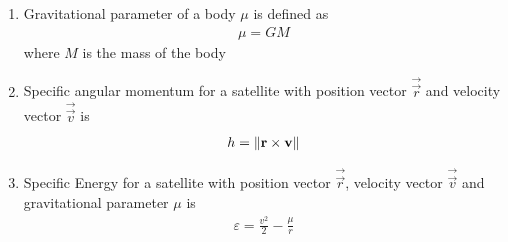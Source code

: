 \begin{enumerate}[label=\thesubsection.\arabic*, ref=\thesubsection.\theenumi]
\begin{align}
r^2 \brak{\vec{r}\brak{\theta}^{\top}\vec{V}\vec{r}\brak{\theta}} + 2r \brak{\vec{u}^{\top}\vec{r}\brak{\theta}} + f = 0
\label{eq:EE26BTECH11202-polar_quad}
\end{align}
Evaluating the inner products:
\begin{align}
\vec{n}^{\top}\vec{r}\brak{\theta} &= \myvec{\cos\theta_0 & \sin\theta_0}\myvec{\cos\theta \\ \sin\theta} = \cos\brak{\theta - \theta_0}
\\
\vec{r}\brak{\theta}^{\top}\vec{V}\vec{r}\brak{\theta} &= \vec{r}\brak{\theta}^{\top}\brak{\vec{I} - e^2\vec{n}\vec{n}^{\top}}\vec{r}\brak{\theta} = 1 - e^2 \cos^2\brak{\theta - \theta_0}
\\
\vec{u}^{\top}\vec{r}\brak{\theta} &= -p e^2 \cos\brak{\theta - \theta_0}
\end{align}
Substituting these into \eqref{eq:EE26BTECH11202-polar_quad}:
\begin{align}
r^2 \sbrak{1 - e^2 \cos^2\brak{\theta - \theta_0}} - 2r p e^2 \cos\brak{\theta - \theta_0} - p^2 e^2 = 0
\end{align}
Factoring the quadratic expression:
\begin{align}
\sbrak{r\brak{1 + e\cos\brak{\theta - \theta_0}} - ep} \sbrak{r\brak{1 - e\cos\brak{\theta - \theta_0}} + ep} = 0
\end{align}
Taking the positive real root for radial distance $r > 0$:
\begin{align}
r\brak{1 + e\cos\brak{\theta - \theta_0}} = ep
\end{align}
yielding \eqref{eq:EE26BTECH11202-polar_conic}
\item Gravitational parameter of a body $\mu$ is defined as
\begin{align}
	\mu=GM
\end{align}
where $M$ is the mass of the body
\item Specific angular momentum for a satellite with position vector $\vec{\vec{r}}$ and velocity vector $\vec{\vec{v}}$ is 
\begin{align}
	h= \left\lVert\mathbf{r} \times \mathbf{v}\right\rVert \label{eq:EE26BTECH11202-ang-moment}
\end{align}
\item Specific Energy for a satellite with position vector $\vec{\vec{r}}$, velocity vector $\vec{\vec{v}}$ and gravitational parameter $\mu$ is 
\begin{align}
\varepsilon = \frac{v^2}{2} - \frac{\mu}{r} \label{eq:EE26BTECH11202-energy}

\end{align}
\end{enumerate}
